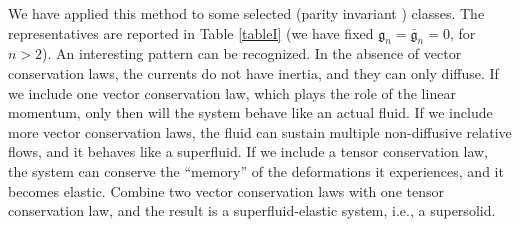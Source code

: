 \documentclass[aps,prl,singlecolumn,nofootinbib]{revtex4-2}
\theoremstyle{definition}
\theoremstyle{theorem}
\begin{document}
We have applied this method to some selected (parity invariant \cite{SperanzaChiral2021}) classes. The representatives are reported in Table \ref{tableI} (we have fixed $\mathfrak{g}_n=\bar{\mathfrak{g}}_n=0$, for $n>2$). An interesting pattern can be recognized. In the absence of vector conservation laws, the currents do not have inertia, and they can only diffuse. If we include one vector conservation law, which plays the role of the linear momentum, only then will the system behave like an actual fluid. If we include more vector conservation laws, the fluid can sustain multiple non-diffusive relative flows, and it behaves like a superfluid. If we include a tensor conservation law, the system can conserve the ``memory'' of the deformations it experiences, and it becomes elastic. Combine two vector conservation laws with one tensor conservation law, and the result is a superfluid-elastic system, i.e., a supersolid.
\end{document}
